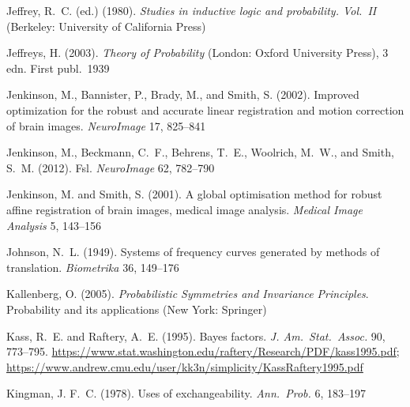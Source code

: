 \documentclass[%
]{frontiersSCNS-nologo} %
\renewcommand*{\|}{\mathpunct{|}}%
\begin{document}
\begin{thebibliography}{156}
Jeffrey, R.~C. (ed.) (1980).
\newblock \emph{Studies in inductive logic and probability. Vol.~II} (Berkeley:
  University of California Press)

Jeffreys, H. (2003).
\newblock \emph{Theory of Probability} (London: Oxford University Press), 3
  edn.
\newblock First publ.\ 1939

Jenkinson, M., Bannister, P., Brady, M., and Smith, S. (2002).
\newblock Improved optimization for the robust and accurate linear registration
  and motion correction of brain images.
\newblock \emph{NeuroImage} 17, 825--841

Jenkinson, M., Beckmann, C.~F., Behrens, T.~E., Woolrich, M.~W., and Smith,
  S.~M. (2012).
\newblock Fsl.
\newblock \emph{NeuroImage} 62, 782--790

Jenkinson, M. and Smith, S. (2001).
\newblock A global optimisation method for robust affine registration of brain
  images, medical image analysis.
\newblock \emph{Medical Image Analysis} 5, 143--156

Johnson, N.~L. (1949).
\newblock Systems of frequency curves generated by methods of translation.
\newblock \emph{Biometrika} 36, 149--176

Kallenberg, O. (2005).
\newblock \emph{Probabilistic Symmetries and Invariance Principles}.
\newblock Probability and its applications (New York: Springer)

Kass, R.~E. and Raftery, A.~E. (1995).
\newblock Bayes factors.
\newblock \emph{J. Am.\ Stat.\ Assoc.} 90, 773--795.
\newblock
  \url{https://www.stat.washington.edu/raftery/Research/PDF/kass1995.pdf};
  \url{https://www.andrew.cmu.edu/user/kk3n/simplicity/KassRaftery1995.pdf}

Kingman, J. F.~C. (1978).
\newblock Uses of exchangeability.
\newblock \emph{Ann.\ Prob.} 6, 183--197


\end{thebibliography}
\end{document}
